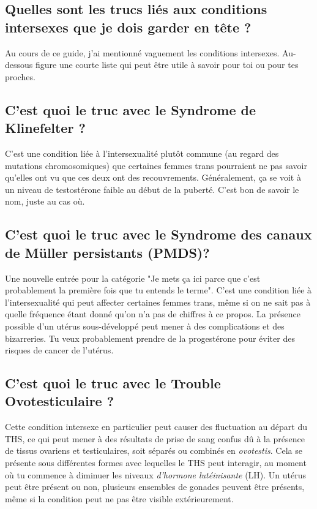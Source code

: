 \documentclass{article}
\begin{document}
\subsection{Quelles sont les trucs liés aux conditions intersexes que je dois garder en tête ?}

Au cours de ce guide, j'ai mentionné vaguement les conditions intersexes. Au-dessous figure une courte liste qui peut être utile à savoir pour toi ou pour tes proches.

\subsection{C'est quoi le truc avec le Syndrome de Klinefelter ?}

C'est une condition liée à l'intersexualité plutôt commune (au regard des mutations chromosomiques) que certaines femmes trans pourraient ne pas savoir qu'elles ont vu que ces deux ont des recouvrements. Généralement, ça se voit à un niveau de testostérone faible au début de la puberté. C'est bon de savoir le nom, juste au cas où.

\subsection{C'est quoi le truc avec le Syndrome des canaux de Müller persistants (PMDS)?}

Une nouvelle entrée pour la catégorie "Je mets ça ici parce que c'est probablement la première fois que tu entends le terme". C'est une condition liée à l'intersexualité qui peut affecter certaines femmes trans, même si on ne sait pas à quelle fréquence étant donné qu'on n'a pas de chiffres à ce propos. La présence possible d'un utérus sous-développé peut mener à des complications et des bizarreries. Tu veux probablement prendre de la progestérone pour éviter des risques de cancer de l'utérus.

\subsection{C'est quoi le truc avec le Trouble Ovotesticulaire ?}

Cette condition intersexe en particulier peut causer des fluctuation au départ du THS, ce qui peut mener à des résultats de prise de sang confus dû à la présence de tissus ovariens et testiculaires, soit séparés ou combinés en \textit{ovotestis}. Cela se présente sous différentes formes avec lequelles le THS peut interagir, au moment où tu commence à diminuer les niveaux \textit{d'hormone lutéinisante} (LH). Un utérus peut être présent ou non, plusieurs ensembles de gonades peuvent être présents, même si la condition peut ne pas être visible extérieurement.
\end{document}
